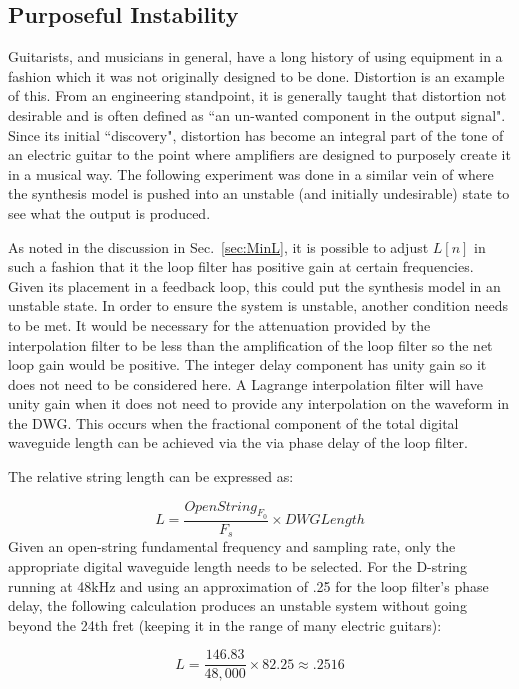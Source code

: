 \documentclass[../main.tex]{subfiles}
\begin{document}
\subsection{Purposeful Instability}
Guitarists, and musicians in general, have a long history of using equipment in a fashion which it was not originally designed to be done. Distortion is an example of this. From an engineering standpoint, it is generally taught that distortion not desirable and is often defined as ``an un-wanted component in the output signal". Since its initial ``discovery", distortion has become an integral part of the tone of an electric guitar to the point where amplifiers are designed to purposely create it in a musical way. The following experiment was done in a similar vein of where the synthesis model is pushed into an unstable (and initially undesirable) state to see what the output is produced.

As noted in the discussion in Sec.~\ref{sec:MinL}, it is possible to adjust $L[n]$ in such a fashion that it the loop filter has positive gain at certain frequencies. Given its placement in a feedback loop, this could put the synthesis model in an unstable state. In order to ensure the system is unstable, another condition needs to be met. It would be necessary for the attenuation provided by the interpolation filter to be less than the amplification of the loop filter so the net loop gain would be positive. The integer delay component has unity gain so it does not need to be considered here. A Lagrange interpolation filter will have unity gain when it does not need to provide any interpolation on the waveform in the DWG. This occurs when the fractional component of the total digital waveguide length can be achieved via the via phase delay of the loop filter.

The relative string length can be expressed as:

\begin{equation}
    L = \frac{OpenString_{F_0}}{F_s} \times DWGLength    
\end{equation}
Given an open-string fundamental frequency and sampling rate, only the appropriate digital waveguide length needs to be selected. For the D-string running at 48kHz and using an approximation of .25 for the loop filter's phase delay, the following calculation produces an unstable system without going beyond the 24th fret (keeping it in the range of many electric guitars):

\begin{equation}
\label{eq:LUnstable}
    L = \frac{146.83}{48,000} \times 82.25 \approx .2516
\end{equation}
\end{document}
